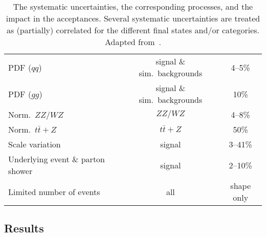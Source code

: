 \begin{table}[!ht]
\begin{center}
\begin{tabular}{lcc}
\hline
 PDF ($qq$)                          & signal \& sim.\ backgrounds  & 4--5\% \\
 PDF ($gg$)                          & signal \& sim.\ backgrounds  & 10\% \\
 Norm.\ $ZZ/WZ$            & $ZZ/WZ$ & 4--8\% \\
 Norm.\ $t\bar{t} + Z$            & $t\bar{t} + Z$ & 50\% \\
 Scale variation                         & signal                       & 3--41\% \\
 Underlying event \& parton shower      & signal                       & 2--10\% \\
\hline
 Limited number of events                & all                 & shape only \\
\end{tabular}
\caption{The systematic uncertainties, the corresponding processes, and the impact in the acceptances. Several systematic uncertainties are treated as (partially) correlated for the different final states and/or categories. Adapted from~\cite{Chatrchyan:2014nva}.
}
\label{tab:uncertainties}
\end{center}
\end{table}


\subsection{Results}

